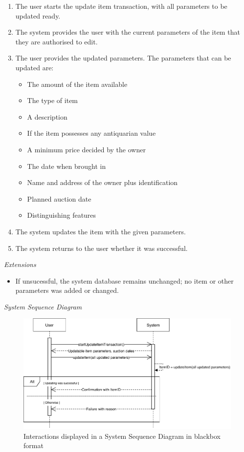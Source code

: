\begin{enumerate}[noitemsep]
	\item The user starts the update item transaction, with all parameters to be updated ready.
	\item The system provides the user with the current parameters of the item that they are authorised to edit.
	\item The user provides the updated parameters. The parameters that can be updated are:
	\begin{itemize}[noitemsep]
		\item The amount of the item available
		\item The type of item
		\item A description
		\item If the item possesses any antiquarian value
		\item A minimum price decided by the owner
		\item The date when brought in
		\item Name and address of the owner plus identification
		\item Planned auction date
		\item Distinguishing features
	\end{itemize}
	\item The system updates the item with the given parameters.
	\item The system returns to the user whether it was successful.
\end{enumerate}
\textsl{Extensions}
\begin{itemize}[noitemsep]
	\item If unsucessful, the system database remains unchanged; no item or other parameters was added or changed.
\end{itemize}
\textsl{System Sequence Diagram}
\begin{figure}[H]
	\centering
	\includegraphics[scale=1]{uml/SD-bb-update.pdf}
	\caption*{Interactions displayed in a System Sequence Diagram in blackbox format}
\end{figure}
